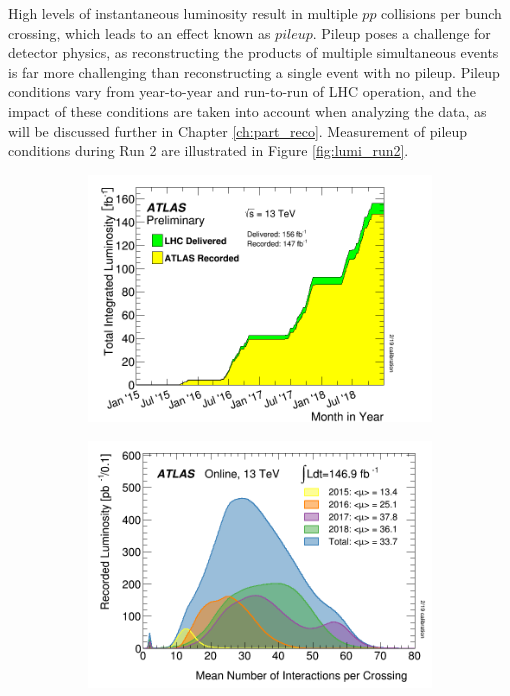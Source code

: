 High levels of instantaneous luminosity result in multiple $pp$ collisions per bunch crossing, which leads to an effect known as $pileup$. Pileup poses a challenge for detector physics, as reconstructing the products of multiple simultaneous events is far more challenging than reconstructing a single event with no pileup. Pileup conditions vary from year-to-year and run-to-run of LHC operation, and the impact of these conditions are taken into account when analyzing the data, as will be discussed further in Chapter \ref{ch:part_reco}. Measurement of pileup conditions during Run 2 are illustrated in Figure \ref{fig:lumi_run2}. \par
 
 \begin{figure}
     \centering
     \begin{subfigure}[b]{0.49\textwidth}
         \centering
         \includegraphics[width=\textwidth]{figures/ch2/lumi_integrated.png}
     \end{subfigure}
     \hfill  
     \begin{subfigure}[b]{0.48\textwidth}
         \centering
         \includegraphics[width=\textwidth]{figures/ch2/lumi_instantaneous.png}

\end{subfigure}
\end{figure}

